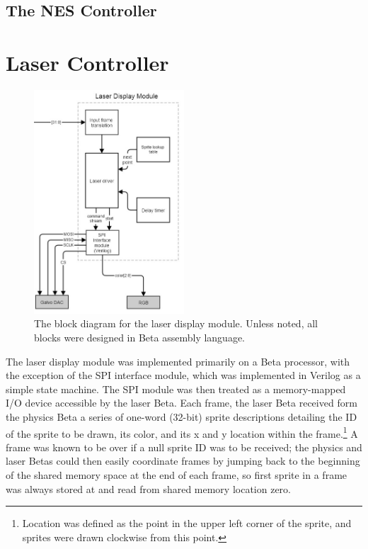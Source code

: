 \documentclass{article}
\begin{document}
\subsection{The NES Controller}

\section{Laser Controller} \label{laser}

\begin{figure}[H]
\begin{center}
\includegraphics[width=0.5\textwidth]{laser}
\caption{The block diagram for the laser display module. Unless noted, all blocks were designed in Beta assembly language.}
\end{center}
\end{figure}

The laser display module was implemented primarily on a Beta processor, with the exception of the SPI interface module, which was implemented in Verilog as a simple state machine. The SPI module was then treated as a memory-mapped I/O device accessible by the laser Beta. Each frame, the laser Beta received form the physics Beta a series of one-word (32-bit) sprite descriptions detailing the ID of the sprite to be drawn, its color, and its x and y location within the frame.\footnote{Location was defined as the point in the upper left corner of the sprite, and sprites were drawn clockwise from this point.} A frame was known to be over if a null sprite ID was to be received; the physics and laser Betas could then easily coordinate frames by jumping back to the beginning of the shared memory space at the end of each frame, so first sprite in a frame was always stored at and read from shared memory location zero.
\end{document}
